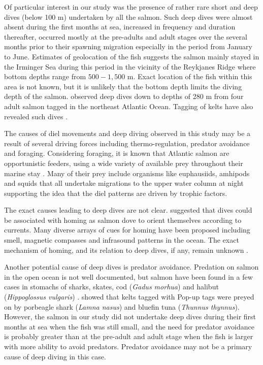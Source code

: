 Of particular interest in our study was the presence of rather rare short and deep dives (below 100 m) undertaken by all the salmon. 
Such deep dives were almost absent during the first months at sea, increased in frequency and duration thereafter, occurred mostly at the pre-adults and adult stages over the several months prior to their spawning migration especially in the period from January to June.  
Estimates of geolocation of the fish suggests the salmon mainly stayed in the Irminger Sea during this period \citep{Gudjonsson2015} in the vicinity of the Reykjanes Ridge where bottom depths range from $500 - 1,500$ m.  
Exact location of the fish within this area is not known, but it is unlikely that the bottom depth limits the diving depth of the salmon. 
\cite{Holm2006} observed deep dives down to depths of 280 m from four adult salmon tagged in the northeast Atlantic Ocean. 
Tagging of kelts have also revealed such dives \citep{Reddin2011,Chittenden2013,Strom2017}.

The causes of diel movements and deep diving observed in this study may be a result of several driving forces including thermo-regulation, predator avoidance and foraging.
Considering foraging, it is known that Atlantic salmon are opportunistic feeders, using a wide variety of available prey throughout their marine stay \citep{Rikardsen2011}. 
Many of their prey include organisms like euphausiids, amhipods and squids that all undertake migrations to the upper water column at night \citep{Walker2000} supporting the idea that the diel patterns are driven by trophic factors. 

The exact causes leading to deep dives are not clear. \cite{Westerberg1982a,Westerberg1982b} suggested that dives could be associated with homing as salmon dove to orient themselves according to currents. Many diverse arrays of cues for homing have been proposed including smell, magnetic compasses and infrasound patterns in the ocean. The exact mechanism of homing, and its relation to deep dives, if any, remain unknown \citep{Thorstad2011}.

Another potential cause of deep dives is predator avoidance. 
Predation on salmon in the open ocean is not well documented, but salmon have been found in a few cases in stomachs of sharks, skates, cod (\textit{Gadus morhua}) and halibut (\textit{Hippoglossus vulgaris}) \citep{Ward2011}. \cite{Lacroix2014} showed that kelts tagged with Pop-up tags were preyed on by porbeagle shark (\textit{Lamna nasus}) and bluefin tuna (\textit{Thunnus thynnus}). However, the salmon in our study did not undertake deep dives during their first months at sea when the fish was still small, and the need for predator avoidance is probably greater than at the pre-adult and adult stage when the fish is larger with more ability to avoid predators. Predator avoidance may not be a primary cause of deep diving in this case.


